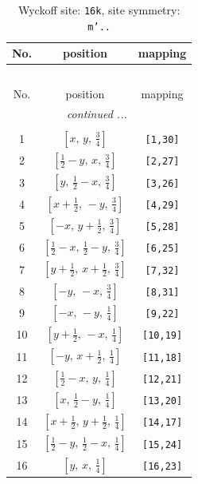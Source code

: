 \documentclass[fleqn,8pt]{jsarticle}
\begin{document}
\renewcommand{\arraystretch}{1.2}
\begin{longtable}{ccc}
\caption{Wyckoff site: {\tt 16k}, site symmetry: {\tt m'..}}
 \\
 \hline \hline
No. & position & mapping \\ \hline \endfirsthead

\multicolumn{2}{l}{\tablename\ \thetable{}} \\
 \hline \hline
No. & position & mapping \\ \hline \endhead

 \hline \hline
\multicolumn{2}{r}{\footnotesize\it continued ...} \\ \endfoot

 \hline \hline
\multicolumn{2}{r}{} \\ \endlastfoot

1 & $\left[ x,\, y,\, \frac{3}{4} \right]$ & {\tt [1,30]} \\ \hline
2 & $\left[ \frac{1}{2} - y,\, x,\, \frac{3}{4} \right]$ & {\tt [2,27]} \\ \hline
3 & $\left[ y,\, \frac{1}{2} - x,\, \frac{3}{4} \right]$ & {\tt [3,26]} \\ \hline
4 & $\left[ x + \frac{1}{2},\, - y,\, \frac{3}{4} \right]$ & {\tt [4,29]} \\ \hline
5 & $\left[ - x,\, y + \frac{1}{2},\, \frac{3}{4} \right]$ & {\tt [5,28]} \\ \hline
6 & $\left[ \frac{1}{2} - x,\, \frac{1}{2} - y,\, \frac{3}{4} \right]$ & {\tt [6,25]} \\ \hline
7 & $\left[ y + \frac{1}{2},\, x + \frac{1}{2},\, \frac{3}{4} \right]$ & {\tt [7,32]} \\ \hline
8 & $\left[ - y,\, - x,\, \frac{3}{4} \right]$ & {\tt [8,31]} \\ \hline
9 & $\left[ - x,\, - y,\, \frac{1}{4} \right]$ & {\tt [9,22]} \\ \hline
10 & $\left[ y + \frac{1}{2},\, - x,\, \frac{1}{4} \right]$ & {\tt [10,19]} \\ \hline
11 & $\left[ - y,\, x + \frac{1}{2},\, \frac{1}{4} \right]$ & {\tt [11,18]} \\ \hline
12 & $\left[ \frac{1}{2} - x,\, y,\, \frac{1}{4} \right]$ & {\tt [12,21]} \\ \hline
13 & $\left[ x,\, \frac{1}{2} - y,\, \frac{1}{4} \right]$ & {\tt [13,20]} \\ \hline
14 & $\left[ x + \frac{1}{2},\, y + \frac{1}{2},\, \frac{1}{4} \right]$ & {\tt [14,17]} \\ \hline
15 & $\left[ \frac{1}{2} - y,\, \frac{1}{2} - x,\, \frac{1}{4} \right]$ & {\tt [15,24]} \\ \hline
16 & $\left[ y,\, x,\, \frac{1}{4} \right]$ & {\tt [16,23]} \\
\end{longtable}
\end{document}
